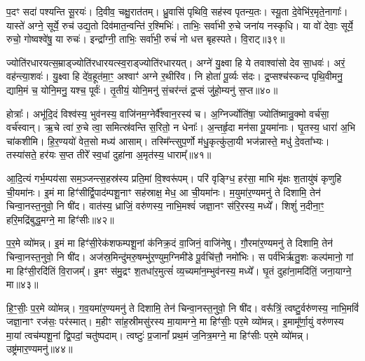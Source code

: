 प॒दꣳ सदा॑ पश्यन्ति सू॒रयः॑। दि॒वीव॒ चक्षु॒रात॑तम्। ध्रु॒वासि॑ पृथिवि॒ सह॑स्व पृतन्य॒तः। स्यू॒ता दे॒वेभि॑र॒मृते॒नागाः᳚। यास्ते॑ अग्ने॒ सूर्ये॒ रुच॑ उद्य॒तो दिव॑मात॒न्वन्ति॑ र॒श्मिभिः॑। ताभिः॒ सर्वा॑भी रु॒चे जना॑य नस्कृधि। या वो॑ देवाः॒ सूर्ये॒ रुचो॒ गोष्वश्वे॑षु॒ या रुचः॑। इन्द्रा᳚ग्नी॒ ताभिः॒ सर्वा॑भी॒ रुचं॑ नो धत्त बृहस्पते। वि॒राट्॥३९॥

ज्योति॑रधारयत्स॒म्राड्ज्योति॑रधारयत्स्व॒राड्ज्योति॑रधारयत्। अग्ने॑ यु॒क्ष्वा हि ये तवाश्वा॑सो देव सा॒धवः॑। अरं॒ वह॑न्त्या॒शवः॑। यु॒क्ष्वा हि दे॑व॒हूत॑मा॒ꣳ॒ अश्वाꣳ॑ अग्ने र॒थीरि॑व। नि होता॑ पू॒र्व्यः स॑दः। द्र॒प्सश्च॑स्कन्द पृथि॒वीमनु॒ द्यामि॒मं च॒ योनि॒मनु॒ यश्च॒ पूर्वः॑। तृ॒तीयं॒ योनि॒मनु॑ सं॒चर॑न्तं द्र॒प्सं जु॑हो॒म्यनु॑ स॒प्त॥४०॥

होत्राः᳚। अभू॑दि॒दं विश्व॑स्य॒ भुव॑नस्य॒ वाजि॑नम॒ग्नेर्वै᳚श्वान॒रस्य॑ च। अ॒ग्निर्ज्योति॑षा॒ ज्योति॑ष्मान्रु॒क्मो वर्च॑सा॒ वर्च॑स्वान्। ऋ॒चे त्वा॑ रु॒चे त्वा॒ समित्स्र॑वन्ति स॒रितो॒ न धेनाः᳚। अ॒न्तर्\mbox{}हृ॒दा मन॑सा पू॒यमा॑नाः। घृ॒तस्य॒ धारा॑ अ॒भि चा॑कशीमि। हि॒र॒ण्ययो॑ वेत॒सो मध्य॑ आसाम्। तस्मि᳚न्त्सुप॒र्णो म॑धु॒कृत्कु॑ला॒यी भज॑न्नास्ते॒ मधु॑ दे॒वता᳚भ्यः। तस्या॑सते॒ हर॑यः स॒प्त तीरे᳚ स्व॒धां दुहा॑ना अ॒मृत॑स्य॒ धाराम्᳚॥४१॥

{\anuvakamend[{प्र॒ति॒ष्ठायै॑ स॒हस्र॑वीर्या पर॒मं वि॒राट्थ्स॒प्त तीरे॑ च॒त्वारि॑ च॥९॥}]}

आ॒दि॒त्यं गर्भ॒म्पय॑सा सम॒ञ्जन्त्स॒हस्र॑स्य प्रति॒मां वि॒श्वरू॑पम्। परि॑ वृङ्ग्धि॒ हर॑सा॒ माभि मृ॑क्षः श॒तायु॑षं कृणुहि ची॒यमा॑नः। इ॒मं मा हिꣳ॑सीर्द्वि॒पाद॑म्पशू॒नाꣳ सह॑स्राक्ष॒ मेध॒ आ ची॒यमा॑नः। म॒युमा॑र॒ण्यमनु॑ ते दिशामि॒ तेन॑ चिन्वा॒नस्त॒नुवो॒ नि षी॑द। वात॑स्य॒ ध्राजिं॒ वरु॑णस्य॒ नाभि॒मश्वं॑ जज्ञा॒नꣳ स॑रि॒रस्य॒ मध्ये᳚। शिशुं॑ न॒दीना॒ꣳ॒ हरि॒मद्रि॑बुद्ध॒मग्ने॒ मा हिꣳ॑सीः॥४२॥

प॒र॒मे व्यो॑मन्न्। इ॒मं मा हिꣳ॑सी॒रेक॑शफम्पशू॒नां क॑निक्र॒दं वा॒जिनं॒ वाजि॑नेषु। गौ॒रमा॑र॒ण्यमनु॑ ते दिशामि॒ तेन॑ चिन्वा॒नस्त॒नुवो॒ नि षी॑द। अज॑स्र॒मिन्दु॑मरु॒षम्भु॑र॒ण्युम॒ग्निमी॑डे पू॒र्वचि॑त्तौ॒ नमो॑भिः। स पर्व॑भिर्\mbox{}ऋतु॒शः कल्प॑मानो॒ गां मा हिꣳ॑सी॒रदि॑तिं वि॒राजम्᳚। इ॒मꣳ स॑मु॒द्रꣳ श॒तधा॑र॒मुत्सं॑ व्य॒च्यमा॑न॒म्भुव॑नस्य॒ मध्ये᳚। घृ॒तं दुहा॑ना॒मदि॑तिं॒ जना॒याग्ने॒ मा॥४३॥

हि॒ꣳ॒सीः॒ प॒र॒मे व्यो॑मन्न्। ग॒व॒यमा॑र॒ण्यमनु॑ ते दिशामि॒ तेन॑ चिन्वा॒नस्त॒नुवो॒ नि षी॑द। वरू᳚त्रिं॒ त्वष्टु॒र्वरु॑णस्य॒ नाभि॒मविं॑ जज्ञा॒नाꣳ रज॑सः॒ पर॑स्मात्। म॒हीꣳ सा॑ह॒स्रीमसु॑रस्य मा॒यामग्ने॒ मा हिꣳ॑सीः॒ पर॒मे व्यो॑मन्न्। इ॒मामू᳚र्णा॒युं वरु॑णस्य मा॒यां त्वच॑म्पशू॒नां द्वि॒पदां॒ चतु॑ष्पदाम्। त्वष्टुः॑ प्र॒जानां᳚ प्रथ॒मं ज॒नित्र॒मग्ने॒ मा हिꣳ॑सीः पर॒मे व्यो॑मन्न्। उष्ट्र॑मार॒ण्यमनु॑॥४४॥

